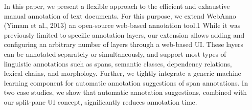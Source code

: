 In this paper, we present a flexible approach to the efficient and exhaustive manual annotation of text documents. For this purpose, we extend WebAnno (Yimam et al., 2013) an open-source web-based annotation tool.1 While it was previously limited to specific annotation layers, our extension allows adding and configuring an arbitrary number of layers through a web-based UI. These layers can be annotated separately or simultaneously, and support most types of linguistic annotations such as spans, semantic classes, dependency relations, lexical chains, and morphology. Further, we tightly integrate a generic machine learning component for automatic annotation suggestions of span annotations. In two case studies, we show that automatic annotation suggestions, combined with our split-pane UI concept, significantly reduces annotation time.
